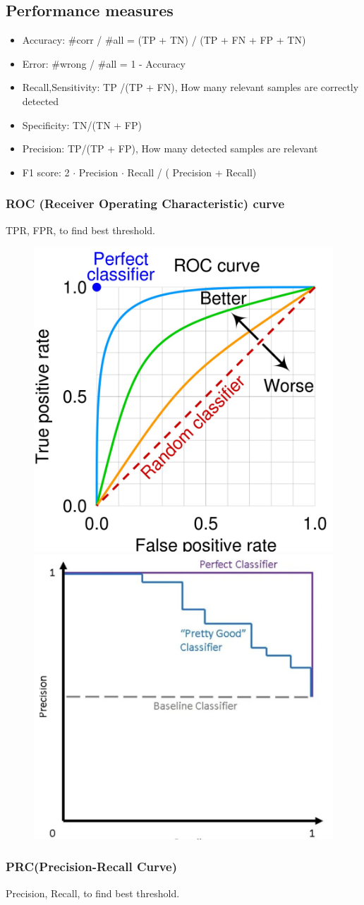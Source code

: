 \subsection{Performance measures}
\begin{itemize}
    \item Accuracy: \#corr / \#all = (TP + TN) / (TP + FN + FP + TN)
    \item Error: \#wrong / \#all = 1 -  Accuracy
    \item Recall,Sensitivity: TP /(TP + FN), How many relevant samples are correctly detected
    
    \item Specificity: TN/(TN + FP)
    \item Precision: TP/(TP + FP), How many detected samples are relevant
    \item F1 score: 2 \(\cdot\) Precision \(\cdot\) Recall / ( Precision + Recall)
\end{itemize}

\subsubsection{ROC (Receiver Operating Characteristic) curve}
TPR, FPR, to find best threshold.
\begin{figure}[!h]
    \includegraphics[width = 0.45\columnwidth]{figures/02/ROC.png}
    \includegraphics[width =0.45 \columnwidth]{figures/02/PRC.png}
\end{figure}

\subsubsection{PRC(Precision-Recall Curve)}
Precision, Recall, to find best threshold.

